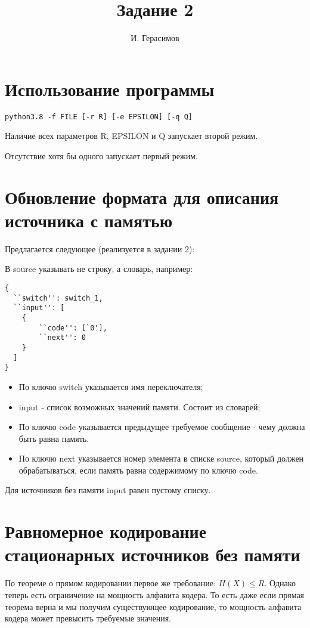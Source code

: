 \documentclass{article}
\title{Задание 2}
\author{И. Герасимов}
\date{}
\begin{document}
\maketitle

\section{Использование программы}

\begin{verbatim}
python3.8 -f FILE [-r R] [-e EPSILON] [-q Q]
\end{verbatim}

Наличие всех параметров R, EPSILON и Q запускает второй режим.

Отсутствие хотя бы одного запускает первый режим.

\section{Обновление формата для описания источника с памятью}

	Предлагается следующее (реализуется в задании 2):
	
	В source указывать не строку, а словарь, например:
	\begin{verbatim}
{
  ``switch'': switch_1,
  ``input'': [
    {
    	``code'': [`0'],
    	``next'': 0
    }
  ]
}
	\end{verbatim}

\begin{itemize}
\item По ключю switch указывается имя переключателя;
\item input - список возможных значений памяти. Состоит из словарей;
\item По ключю code указывается предыдущее требуемое сообщение - чему должна быть равна память.
\item По ключю next указывается номер элемента в списке source, который должен обрабатываться, если память равна содержимому по ключю code.
\end{itemize}

Для источников без памяти input равен пустому списку.

\section{Равномерное кодирование стационарных источников без памяти}

По теореме о прямом кодировании первое же требование: $H(X) \leq R$.
Однако теперь есть ограничение на мощность алфавита кодера. То есть даже если прямая теорема верна и мы получим существующее кодирование, то мощность алфавита кодера может превысить требуемые значения.
\end{document}
